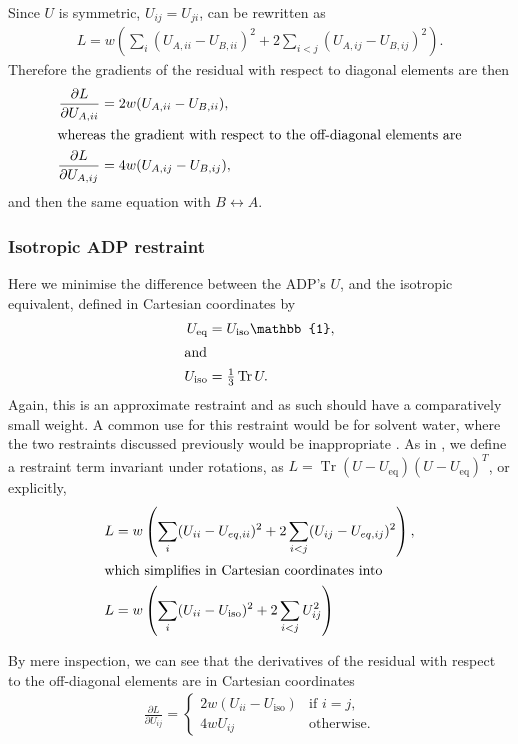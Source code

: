 \documentclass[11pt]{article}
\newcommand{\mat}[1]{#1}
\newcommand{\identity}{\mathbb{1}}
\newcommand{\tr}{\operatorname{Tr}}
\newcommand{\partialder}[2]{\frac{\partial #1}{\partial #2}}
\begin{document}
Since $\mat{U}$ is symmetric,  $U_{ij} = U_{ji}$,  can be rewritten as
\begin{align}
L = w \left( \sum_i (U_{A,ii} - U_{B,ii})^2 + 2 \sum_{i < j} (U_{A,ij} - U_{B,ij})^2 \right) .
\end{align}
Therefore the gradients of the residual with respect to diagonal elements are then
\begin{align}
\partialder{L}{U_{A,ii}} &= 2w(U_{A,ii} - U_{B,ii}),\\
\intertext{whereas the gradient with respect to the off-diagonal elements are}
\partialder{L}{U_{A,ij}} &=  4w(U_{A,ij} - U_{B,ij}),
\end{align}
and then the same equation with $B \leftrightarrow A$.

\subsubsection{Isotropic ADP restraint}
Here we minimise the difference between the ADP's $\mat{U}$, and the isotropic equivalent, defined in Cartesian coordinates by
\begin{align}
\mat{U}_\text{eq} &= U_\text{iso}\identity, \\
\intertext{and}
U_\text{iso} &= \tfrac{1}{3} \tr \mat{U}.
\end{align}
Again, this is an approximate restraint and as such should have a comparatively small weight. A common use for this restraint would be for solvent water, where the two restraints discussed previously would be inappropriate \cite{Sheldrick:1997aa}. As in , we define a restraint term invariant under rotations, as $L = \tr (U-U_\text{eq})(U-U_\text{eq})^T$, or explicitly,
\begin{align}
\label{eqn:ADP:restraints:isotropic}
L &= w \left( \sum_i (U_{ii} - U_{eq,ii})^2 + 2 \sum_{i<j} (U_{ij}-U_{eq,ij})^2 \right),\\
\intertext{which simplifies in Cartesian coordinates into}
L &= w \left( \sum_i (U_{ii} - U_\text{iso})^2 + 2 \sum_{i<j} U_{ij}^2 \right)
\end{align}

By mere inspection, we can see that the derivatives of the residual with respect to the off-diagonal elements are in Cartesian coordinates
\begin{align}
\partialder{L}{U_{ij}} = \begin{cases}
 2 w (U_{ii} - U_\text{iso}) & \text{if $i=j$,}\\
 4 w U_{ij} & \text{otherwise}.
 \end{cases}
\end{align}
\end{document}
